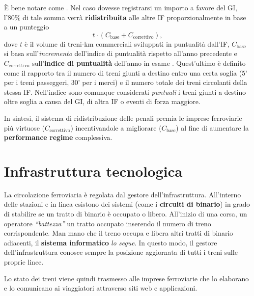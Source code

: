 \documentclass[12pt,italian]{report}
\begin{document}
È bene notare come . Nel caso dovesse registrarsi un importo a favore
del GI, l'80\% di tale somma verrà \textbf{ridistribuita} alle altre
IF proporzionalmente in base a un punteggio
$$
t \cdot (C_\text{base} + C_\text{correttivo}),
$$
dove $t$ è il volume di treni-km commerciali sviluppati in puntualità
dall'IF, $C_\text{base}$ si basa sull'\textit{incremento} dell'indice
di puntualità rispetto all'anno precedente \cite[app.\ 5C, tabella
5a]{RfiPir} e $C_\text{correttivo}$ sull'\textbf{indice di puntualità}
dell'anno in esame \cite[app.\ 5C, tabella 5b]{RfiPir}.  Quest'ultimo
è definito come il rapporto tra il numero di treni giunti a destino
entro una certa soglia (5' per i treni passeggeri, 30' per i merci) e
il numero totale dei treni circolanti della stessa IF\@.  Nell'indice
sono comunque considerati \textit{puntuali} i treni giunti a destino
oltre soglia a causa del GI, di altra IF o eventi di forza maggiore.

In sintesi, il sistema di ridistribuzione delle penali premia le
imprese ferroviarie più virtuose ($C_\text{correttivo}$)
incentivandole a migliorare ($C_\text{base}$) al fine di aumentare la
\textbf{performance regime} complessiva.

\section{Infrastruttura tecnologica}
\label{infrastruttura_tecnologica}

La circolazione ferroviaria è regolata dal gestore
dell'infrastruttura.  All'interno delle stazioni e in linea esistono
dei sistemi (come i \textbf{circuiti di binario}) in grado di
stabilire se un tratto di binario è occupato o libero.  All'inizio di
una corsa, un operatore \textit{``battezza''} un tratto occupato
inserendo il numero di treno corrispondente.  Man mano che il treno
occupa e libera altri tratti di binario adiacenti, il \textbf{sistema
    informatico} \textit{lo segue}.  In questo modo, il gestore
dell'infrastruttura conosce sempre la posizione aggiornata di tutti i
treni sulle proprie linee.

Lo stato dei treni viene quindi trasmesso alle imprese ferroviarie che
lo elaborano e lo comunicano ai viaggiatori attraverso siti web e
applicazioni.
\end{document}
